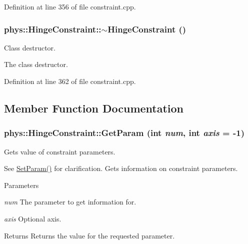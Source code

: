 Definition at line 356 of file constraint.cpp.

\hypertarget{classphys_1_1HingeConstraint_af97da06f82fa1903bb20393760f4ae34}{
\subsubsection[{$\sim$HingeConstraint}]{\setlength{\rightskip}{0pt plus 5cm}phys::HingeConstraint::$\sim$HingeConstraint ()}}
\label{d3/d0d/classphys_1_1HingeConstraint_af97da06f82fa1903bb20393760f4ae34}


Class destructor. 

The class destructor. 

Definition at line 362 of file constraint.cpp.



\subsection{Member Function Documentation}
\hypertarget{classphys_1_1HingeConstraint_a7e8c001ee6291bf457c9860124cacaf8}{
\subsubsection[{GetParam}]{ phys::HingeConstraint::GetParam (int {\em num}, \/  int {\em axis} = {\ttfamily -\/1})}}
\label{d3/d0d/classphys_1_1HingeConstraint_a7e8c001ee6291bf457c9860124cacaf8}


Gets value of constraint parameters. 

See \hyperlink{classphys_1_1HingeConstraint_adec79d062d67532e3521eaae6b49f877}{SetParam()} for clarification. Gets information on constraint parameters. 
\begin{DoxyParams}{Parameters}
\item[{\em num}]The parameter to get information for. \item[{\em axis}]Optional axis. \end{DoxyParams}
\begin{DoxyReturn}{Returns}
Returns the value for the requested parameter. 
\end{DoxyReturn}


